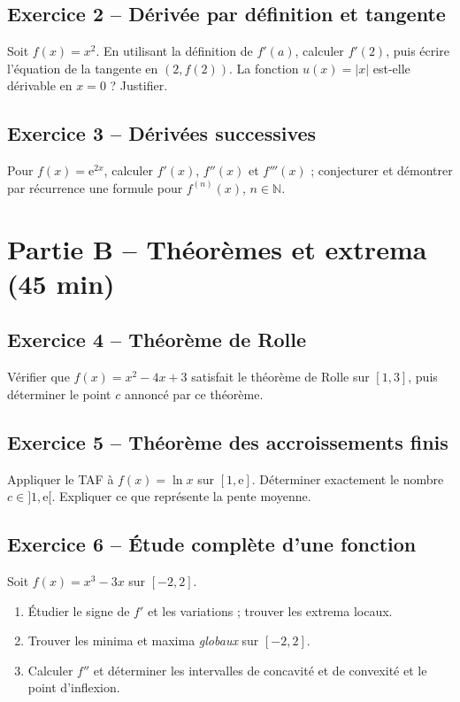 \documentclass[11pt,a4paper,oneside]{article}
\newcommand{\e}{\mathrm e}
\begin{document}
\subsection*{Exercice 2 -- Dérivée par définition et tangente}
Soit $f(x)=x^2$. En utilisant la définition de $f'(a)$, calculer $f'(2)$, puis écrire l'équation de la tangente en $(2,f(2))$. La fonction $u(x)=|x|$ est-elle dérivable en $x=0$ ? Justifier.

\subsection*{Exercice 3 -- Dérivées successives}
Pour $f(x)=\e^{2x}$, calculer $f'(x)$, $f''(x)$ et $f'''(x)$ ; conjecturer et démontrer par récurrence une formule pour $f^{(n)}(x)$, $n\in\mathbb N$.

\section*{Partie B -- Théorèmes et extrema (45 min)}
\subsection*{Exercice 4 -- Théorème de Rolle}
Vérifier que $f(x)=x^2-4x+3$ satisfait le théorème de Rolle sur $[1,3]$, puis déterminer le point $c$ annoncé par ce théorème.

\subsection*{Exercice 5 -- Théorème des accroissements finis}
Appliquer le TAF à $f(x)=\ln x$ sur $[1,\e]$. Déterminer exactement le nombre $c\in]1,\e[$. Expliquer ce que représente la pente moyenne.

\subsection*{Exercice 6 -- Étude complète d'une fonction}
Soit $f(x)=x^3-3x$ sur $[-2,2]$.
\begin{enumerate}[label=\alph*)]
\item Étudier le signe de $f'$ et les variations ; trouver les extrema locaux.
\item Trouver les minima et maxima \emph{globaux} sur $[-2,2]$.
\item Calculer $f''$ et déterminer les intervalles de concavité et de convexité et le point d'inflexion.
\end{enumerate}
\end{document}
